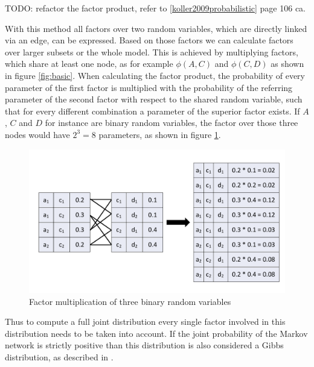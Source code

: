 TODO: refactor the factor product, refer to \ref{koller2009probabilistic} page 106 ca.

With this method all factors over two random variables, which are directly linked via an edge, can be expressed. Based on those factors we can calculate factors over larger subsets or the whole model. This is achieved by multiplying factors, which share at least one node, as for example $\phi(A,C)$ and $\phi(C,D)$ as shown in figure \ref{fig:basic}. When calculating the factor product, the probability of every parameter of the first factor is multiplied with the probability of the referring parameter of the second factor with respect to the shared random variable, such that for every different combination a parameter of the superior factor exists. If $A$, $C$ and $D$ for instance are binary random variables, the factor over those three nodes would have $2^3=8$ parameters, as shown in figure \ref{fig:parammult}.

\begin{figure}[htpb]
  \centering
  	\includegraphics[scale=0.4]{img/parammult.pdf} 
  \caption{Factor multiplication of three binary random variables}
  \label{fig:parammult}
\end{figure}

Thus to compute a full joint distribution every single factor involved in this distribution needs to be taken into account. If the joint probability of the Markov network is strictly positive than this distribution is also considered a Gibbs distribution, as described in \cite{kindermann1980markov}.
